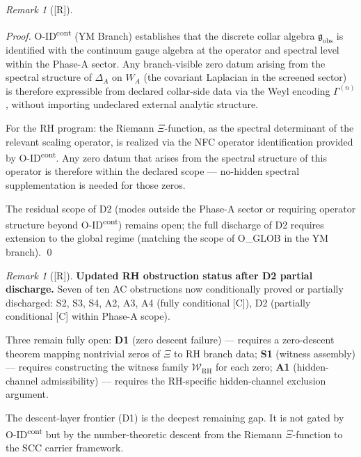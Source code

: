 \documentclass[12pt,oneside]{amsbook}
\theoremstyle{plain}
\theoremstyle{definition}
\theoremstyle{remark}
\newtheorem{remark}[theorem]{Remark}
\newcommand{\status}[1]{\textup{[#1]}}
\begin{document}
\begin{remark}[\status{R}]
\begin{proof}
O-ID\textsuperscript{cont} (YM Branch) establishes that the discrete
collar algebra $\mathfrak{g}_{\mathrm{obs}}$ is identified with the
continuum gauge algebra at the operator and spectral level within
the Phase-A sector. Any branch-visible zero datum arising from
the spectral structure of $\Delta_A$ on $W_A$ (the covariant
Laplacian in the screened sector) is therefore expressible from
declared collar-side data via the Weyl encoding $\Gamma^{(n)}$,
without importing undeclared external analytic structure.

For the RH program: the Riemann $\Xi$-function, as the spectral
determinant of the relevant scaling operator, is realized via the
NFC operator identification provided by O-ID\textsuperscript{cont}.
Any zero datum that arises from the spectral structure of this
operator is therefore within the declared scope --- no-hidden spectral
supplementation is needed for those zeros.

The residual scope of D2 (modes outside the Phase-A sector or
requiring operator structure beyond O-ID\textsuperscript{cont})
remains open; the full discharge of D2 requires extension to the
global regime (matching the scope of O\_GLOB in the YM branch). \qed
\end{proof}

\begin{remark}[\status{R}]\label{rem:rh-after-d2}
\textbf{Updated RH obstruction status after D2 partial discharge.}
Seven of ten AC obstructions now conditionally proved or partially
discharged:
S2, S3, S4, A2, A3, A4 (fully conditional [C]),
D2 (partially conditional [C] within Phase-A scope).

Three remain fully open:
\textbf{D1} (zero descent failure) --- requires a zero-descent
theorem mapping nontrivial zeros of $\Xi$ to RH branch data;
\textbf{S1} (witness assembly) --- requires constructing the
witness family $\mathcal{W}_{\mathrm{RH}}$ for each zero;
\textbf{A1} (hidden-channel admissibility) --- requires the
RH-specific hidden-channel exclusion argument.

The descent-layer frontier (D1) is the deepest remaining gap.
It is not gated by O-ID\textsuperscript{cont} but by the
number-theoretic descent from the Riemann $\Xi$-function to
the SCC carrier framework.
\end{remark}

\end{remark}

\end{document}
